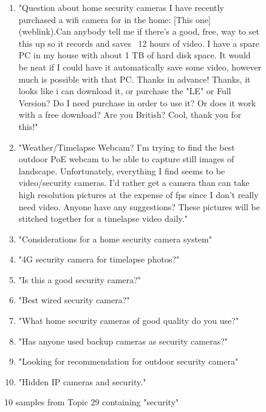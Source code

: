 \documentclass{article}
\begin{document}
    \begin{figure}[H]
        \begin{footnotesize}
        \begin{enumerate}
            \item "Question about home security cameras I have recently purchased a wifi camera for in the home: [This one](weblink).Can anybody tell me if there's a good, free, way to set this up so it records and saves ~12 hours of video. I have a spare PC in my house with about 1 TB of hard disk space. It would be neat if I could have it automatically save some video, however much is possible with that PC. Thanks in advance! Thanks, it looks like i can download it, or purchase the "LE" or Full Version? Do I need purchase in order to use it? Or does it work with a free download? Are you British? Cool, thank you for this!"
            \item "Weather/Timelapse Webcam? I'm trying to find the best outdoor PoE webcam to be able to capture still images of landscape.  Unfortunately, everything I find seems to be video/security cameras.  I'd rather get a camera than can take high resolution pictures at the expense of fps since I don't really need video.  Anyone have any suggestions? These pictures will be stitched together for a timelapse video daily."
            \item "Considerations for a home security camera system"
            \item "4G security camera for timelapse photos?"
            \item "Is this a good security camera?"
            \item "Best wired security camera?"
            \item "What home security cameras of good quality do you use?"
            \item "Has anyone used backup cameras as security cameras?"
            \item "Looking for recommendation for outdoor security camera"
            \item "Hidden IP cameras and security."
        \end{enumerate}
    \end{footnotesize}
        \caption{10 samples from Topic 29 containing "security"}
    \end{figure}
\end{document}

